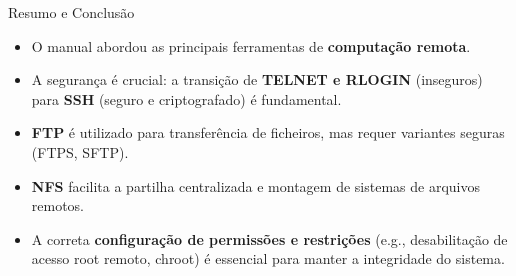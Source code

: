 \documentclass{beamer}
\begin{document}
	\begin{frame}{Resumo e Conclusão}
		\begin{itemize}
			\item O manual abordou as principais ferramentas de \textbf{computação remota}.
			\item A segurança é crucial: a transição de \textbf{TELNET e RLOGIN} (inseguros) para \textbf{SSH} (seguro e criptografado) é fundamental.
			\item \textbf{FTP} é utilizado para transferência de ficheiros, mas requer variantes seguras (FTPS, SFTP).
			\item \textbf{NFS} facilita a partilha centralizada e montagem de sistemas de arquivos remotos.
			\item A correta \textbf{configuração de permissões e restrições} (e.g., desabilitação de acesso root remoto, chroot) é essencial para manter a integridade do sistema.
		\end{itemize}
	\end{frame}
	
\end{document}
